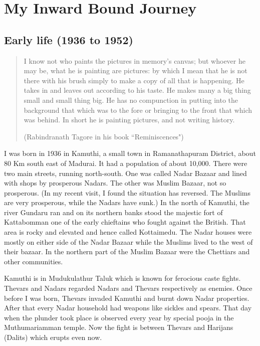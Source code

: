 
\part{My Inward Bound Journey}

\chapter{Early life (1936 to 1952)}

\begin{quote}
I know not who paints the pictures in memory's canvas; but whoever
he may be, what he is painting are pictures: by which I mean that 
he is not there with his brush simply to make a copy of all that is
happening. He takes in and leaves out according to his taste. He
makes many a big thing small and small thing big. He has no compunction 
in putting into the background that which was to the fore or bringing
to the front that which was behind. In short he is painting pictures,
and not writing history.

\hfill (Rabindranath Tagore in his book ``Reminiscences")
\end{quote}


I was born in 1936 in Kamuthi, a small town in Ramanathapuram District, 
about 80 Km south east of Madurai. It had a population of about 10,000. 
There were two main streets, running north-south. One was called Nadar 
Bazaar and lined with shops by prosperous Nadars. The other was Muslim 
Bazaar, not so prosperous. (In my recent visit, I found the situation 
has reversed. The Muslims are very prosperous, while the Nadars have 
sunk.) In the north of Kamuthi, the river Gundaru ran and on its 
northern banks stood the majestic fort of Kattabomman one of the early 
chieftains who fought against the British. That area is rocky and 
elevated and hence called Kottaimedu. The Nadar houses were mostly on 
either side of the Nadar Bazaar while the Muslims lived to the west of 
their bazaar. In the northern part of the Muslim Bazaar were the 
Chettiars and other communities.

Kamuthi is in Mudukulathur Taluk which is known for ferocious caste 
fights. Thevars and Nadars regarded Nadars and Thevars respectively as 
enemies. Once before I was born, Thevars invaded Kamuthi and burnt down 
Nadar properties. After that every Nadar household had weapons like 
sickles and spears. That day when the plunder took place is observed 
every year by special pooja in the Muthumariamman temple. Now the fight 
is between Thevars and Harijans (Dalits) which erupts even now.

